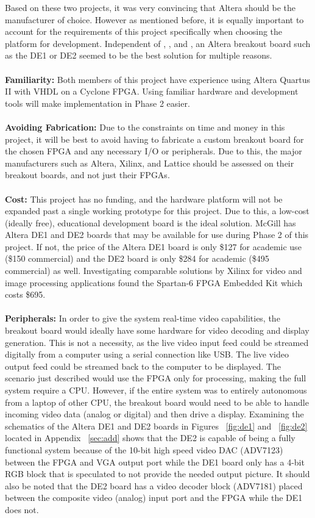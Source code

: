 \documentclass[12pt]{article} %
\begin{document}
Based on these two projects, it was very convincing that Altera should be the manufacturer of choice. However as mentioned before, it is equally important to account for the requirements of this project specifically when choosing the platform for development. Independent of \cite{1}, \cite{2}, and \cite{3}, an Altera breakout board such as the DE1 or DE2 seemed to be the best solution for multiple reasons. \\\\
\textbf{Familiarity:} Both members of this project have experience using Altera Quartus II with VHDL on a Cyclone FPGA. Using familiar hardware and development tools will make implementation in Phase 2 easier. \\\\
\textbf{Avoiding Fabrication:} Due to the constraints on time and money in this project, it will be best to avoid having to fabricate a custom breakout board for the chosen FPGA and any necessary I/O or peripherals. Due to this, the major manufacturers such as Altera, Xilinx, and Lattice should be assessed on their breakout boards, and not just their FPGAs.\\\\
\textbf{Cost:} This project has no funding, and the hardware platform will not be expanded past a single working prototype for this project. Due to this, a low-cost (ideally free), educational development board is the ideal solution. McGill has Altera DE1 and DE2 boards that may be available for use during Phase 2 of this project. If not, the price of the Altera DE1 board is only \$127 for academic use (\$150 commercial) and the DE2 board is only \$284 for academic (\$495 commercial) as well. Investigating comparable solutions by Xilinx for video and image processing applications found the Spartan-6 FPGA Embedded Kit which costs \$695.
\\\\
\textbf{Peripherals:} In order to give the system real-time video capabilities, the breakout board would ideally have some hardware for video decoding and display generation. This is not a necessity, as the live video input feed could be streamed digitally from a computer using  a serial connection like USB. The live video output feed could be streamed back to the computer to be displayed. The scenario just described would use the FPGA only for processing, making the full system require a CPU. However, if the entire system was to entirely autonomous from a laptop of other CPU, the breakout board would need to be able to handle incoming video data (analog or digital) and then drive a display. Examining the schematics of the Altera DE1 and DE2 boards in Figures ~\ref{fig:de1} and ~\ref{fig:de2} located in Appendix ~\ref{sec:add} shows that the DE2 is capable of being a fully functional system because of the 10-bit high speed video DAC (ADV7123) between the FPGA and VGA output port while the DE1 board only has a 4-bit RGB block that is speculated to not provide the needed output picture. It should also be noted that the DE2 board has a video decoder block (ADV7181) placed between the composite video (analog) input port and the FPGA while the DE1 does not.\\\\ 
\end{document}
